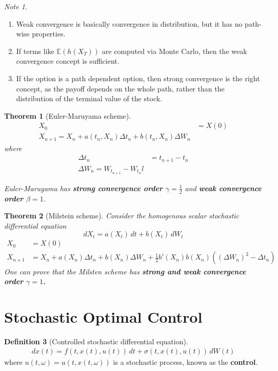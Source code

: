 \documentclass[10pt, oneside, reqno]{amsart}
\theoremstyle{plain}%
\newtheorem{thm}{Theorem}[section]
\theoremstyle{definition}
\newtheorem{defn}[thm]{Definition}
\theoremstyle{remark}
\newtheorem*{note}{Note}
\newcommand{\E}{\mathbb{E}}
\begin{document}
\begin{note}
	\begin{enumerate}
		\item Weak convergence is basically convergence in distribution, but it has no path-wise properties.
		\item If terms like $\E(h(X_T))$ are computed via Monte Carlo, then the weak convergence concept is sufficient.  
		\item If the option is a path dependent option, then strong convergence is the right concept, as the payoff depends on the whole path, rather than the distribution of the terminal value of the stock.  
	\end{enumerate}
\end{note}

\begin{thm}[Euler-Maruyama scheme]
	\begin{align*}
		X_0 &= X(0) \\
		X_{n+1} = X_{n} + a(t_n, X_n) \Delta t_n + b(t_n, X_n) \Delta W_n
	\end{align*} where \begin{align*}
		\Delta t_n &= t_{n+1} - t_n \\
		\Delta W_n = W_{t_{n+1}} - W_{t_n}l
	\end{align*}
	
	Euler-Maruyama has \textbf{strong convergence order $\gamma = \frac{1}{2}$} and \textbf{weak convergence order $\beta = 1$}.
\end{thm}

\begin{thm}[Milstein scheme]
	Consider the homogenous scalar stochastic differential equation \[
		dX_t = a(X_t) \, dt + b(X_t) \, dW_t
	\]  
	\begin{align*}
		X_0 &= X(0) \\
		X_{n+1} &= X_n + a(X_n) \Delta t_n + b(X_n) \Delta W_n + \frac{1}{2} b'(X_n)b(X_n)((\Delta W_n)^2 - \Delta t_n)
	\end{align*}   
	One can prove that the Milsten scheme has \textbf{strong and weak convergence order $\gamma = 1$.}
\end{thm}
\section{Stochastic Optimal Control} %
\label{sec:stochastic_optimal_control}

\begin{defn}[Controlled stochastic differential equation]
	\begin{align*}
		dx(t) = f(t, x(t), u(t)) \, dt + \sigma(t,x(t), u(t)) \, dW(t)
	\end{align*} where $u(t, \omega) = u(t, x(t, \omega))$ is a stochastic process, known as the \textbf{control}.  
\end{defn}
\end{document}
